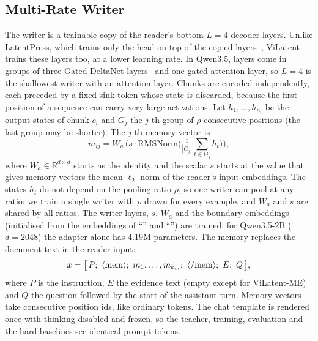 \subsection{Multi-Rate Writer}
\label{sec:writer}
The writer is a trainable copy of the reader's bottom $L = 4$ decoder layers.
Unlike LatentPress, which trains only the head on top of the copied layers~\cite{xu2026latentpress}, ViLatent trains these layers too, at a lower learning rate.
In Qwen3.5, layers come in groups of three Gated DeltaNet layers~\cite{yang2025gdn} and one gated attention layer, so $L = 4$ is the shallowest writer with an attention layer.
Chunks are encoded independently, each preceded by a fixed sink token whose state is discarded, because the first position of a sequence can carry very large activations.
Let $h_1,\dots,h_{n_i}$ be the output states of chunk $c_i$ and $G_j$ the $j$-th group of $\rho$ consecutive positions (the last group may be shorter).
The $j$-th memory vector is
\begin{equation}
m_{ij} = W_a \, \Big( s \cdot \mathrm{RMSNorm}\big(\tfrac{1}{|G_j|} \textstyle\sum_{t \in G_j} h_t \big) \Big),
\label{eq:pool}
\end{equation}
where $W_a \in \mathbb{R}^{d \times d}$ starts as the identity and the scalar $s$ starts at the value that gives memory vectors the mean $\ell_2$ norm of the reader's input embeddings.
The states $h_t$ do not depend on the pooling ratio $\rho$, so one writer can pool at any ratio: we train a single writer with $\rho$ drawn for every example, and $W_a$ and $s$ are shared by all ratios.
The writer layers, $s$, $W_a$ and the boundary embeddings (initialised from the embeddings of ``\guillemotleft'' and ``\guillemotright'') are trained; for Qwen3.5-2B ($d=2048$) the adapter alone has 4.19M parameters.
The memory replaces the document text in the reader input:
\begin{equation}
x = \big[\, P;\ \mem;\ m_1, \dots, m_{k_m};\ \cmem;\ E;\ Q \,\big],
\label{eq:input}
\end{equation}
where $P$ is the instruction, $E$ the evidence text (empty except for ViLatent-ME) and $Q$ the question followed by the start of the assistant turn.
Memory vectors take consecutive position ids, like ordinary tokens.
The chat template is rendered once with thinking disabled and frozen, so the teacher, training, evaluation and the hard baselines see identical prompt tokens.


